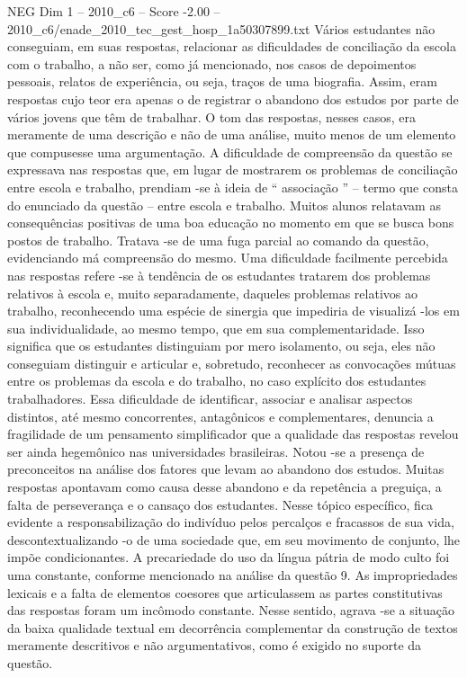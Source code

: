 \begin{textsample}{NEG Dim 1 – 2010\_c6 – Score -2.00 – 2010\_c6/enade\_2010\_tec\_gest\_hosp\_1a50307899.txt}
Vários estudantes não conseguiam, em suas respostas, relacionar as dificuldades de conciliação da escola com o trabalho, a não ser, como já mencionado, nos casos de depoimentos pessoais, relatos de experiência, ou seja, traços de uma biografia.
Assim, eram respostas cujo teor era apenas o de registrar o abandono dos estudos por parte de vários jovens que têm de trabalhar.
O tom das respostas, nesses casos, era meramente de uma descrição e não de uma análise, muito menos de um elemento que compusesse uma argumentação.
A dificuldade de compreensão da questão se expressava nas respostas que, em lugar de mostrarem os problemas de conciliação entre escola e trabalho, prendiam -se à ideia de “ associação ” – termo que consta do enunciado da questão – entre escola e trabalho.
Muitos alunos relatavam as consequências positivas de uma boa educação no momento em que se busca bons postos de trabalho.
Tratava -se de uma fuga parcial ao comando da questão, evidenciando má compreensão do mesmo.
Uma dificuldade facilmente percebida nas respostas refere -se à tendência de os estudantes tratarem dos problemas relativos à escola e, muito separadamente, daqueles problemas relativos ao trabalho, reconhecendo uma espécie de sinergia que impediria de visualizá -los em sua individualidade, ao mesmo tempo, que em sua complementaridade.
Isso significa que os estudantes distinguiam por mero isolamento, ou seja, eles não conseguiam distinguir e articular e, sobretudo, reconhecer as convocações mútuas entre os problemas da escola e do trabalho, no caso explícito dos estudantes trabalhadores.
Essa dificuldade de identificar, associar e analisar aspectos distintos, até mesmo concorrentes, antagônicos e complementares, denuncia a fragilidade de um pensamento simplificador que a qualidade das respostas revelou ser ainda hegemônico nas universidades brasileiras.
Notou -se a presença de preconceitos na análise dos fatores que levam ao abandono dos estudos.
Muitas respostas apontavam como causa desse abandono e da repetência a preguiça, a falta de perseverança e o cansaço dos estudantes.
Nesse tópico específico, fica evidente a responsabilização do indivíduo pelos percalços e fracassos de sua vida, descontextualizando -o de uma sociedade que, em seu movimento de conjunto, lhe impõe condicionantes.
A precariedade do uso da língua pátria de modo culto foi uma constante, conforme mencionado na análise da questão 9.
As impropriedades lexicais e a falta de elementos coesores que articulassem as partes constitutivas das respostas foram um incômodo constante.
Nesse sentido, agrava -se a situação da baixa qualidade textual em decorrência complementar da construção de textos meramente descritivos e não argumentativos, como é exigido no suporte da questão.

\end{textsample}
